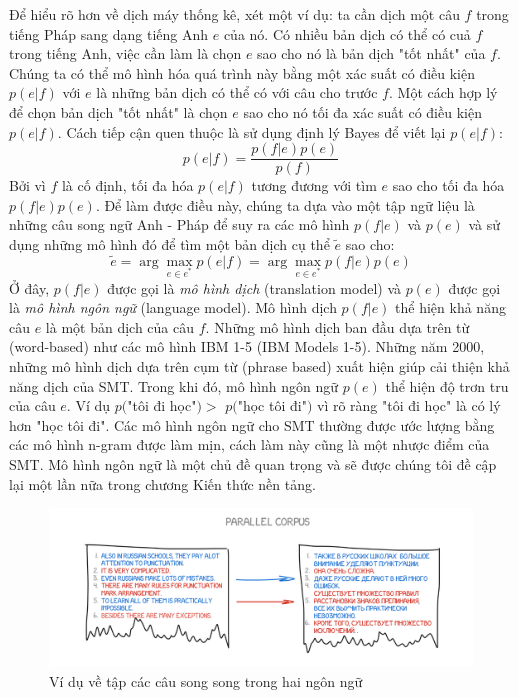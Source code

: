 Để hiểu rõ hơn về dịch máy thống kê, xét một ví dụ: ta cần dịch một câu $f$ trong tiếng Pháp sang dạng tiếng Anh $e$ của nó. Có nhiều bản dịch có thể có cuả $f$ trong tiếng Anh, việc cần làm là chọn $e$ sao cho nó là bản dịch "tốt nhất" của $f$. Chúng ta có thể mô hình hóa quá trình này bằng một xác suất có điều kiện $p(e|f)$ với $e$ là những bản dịch có thể có với câu cho trước $f$. Một cách hợp lý để chọn bản dịch "tốt nhất" là chọn $e$ sao cho nó tối đa xác suất có điều kiện $p(e|f)$. Cách tiếp cận quen thuộc là sử dụng định lý Bayes để viết lại $p(e|f)$:
\begin{equation} \label{bayesFomular}
	p(e|f) = \frac{p(f|e)p(e)}{p(f)}
\end{equation}
Bởi vì $f$ là cố định, tối đa hóa $p(e|f)$ tương đương với tìm $e$ sao cho tối đa hóa $p(f|e)p(e)$. Để làm được điều này, chúng ta dựa vào một tập ngữ liệu là những câu song ngữ Anh - Pháp để suy ra các mô hình $p(f|e)$ và $p(e)$ và sử dụng những mô hình đó để tìm một bản dịch cụ thể $\tilde{e}$ sao cho:
\begin{equation} \label{ehatSMT}
	\tilde{e} = \arg\max_{e \in e^*} p(e|f) = \arg\max_{e \in e^*} p(f|e)p(e)
\end{equation}
Ở đây, $p(f|e)$ được gọi là \textit{mô hình dịch} (translation model) và $p(e)$ được gọi là \textit{mô hình ngôn ngữ} (language model). Mô hình dịch $p(f|e)$ thể hiện khả năng câu $e$ là một bản dịch của câu $f$. Những mô hình dịch ban đầu dựa trên từ (word-based) như các mô hình IBM 1-5 (IBM Models 1-5). Những năm 2000, những mô hình dịch dựa trên cụm từ (phrase based) xuất hiện giúp cải thiện khả năng dịch của SMT. Trong khi đó, mô hình ngôn ngữ $p(e)$ thể hiện độ trơn tru của câu $e$. Ví dụ $p($"tôi đi học"$) >$ $p($"học tôi đi"$)$ vì rõ ràng "tôi đi học" là có lý hơn "học tôi đi". Các mô hình ngôn ngữ cho SMT thường được ước lượng bằng các mô hình n-gram được làm mịn, cách làm này cũng là một nhược điểm của SMT. Mô hình ngôn ngữ là một chủ đề quan trọng và sẽ được chúng tôi đề cập lại một lần nữa trong chương Kiến thức nền tảng.

\begin{figure}
	\centering
	\includegraphics[width=\textwidth]{smt}
	\caption[Ví dụ về tập các câu song song trong hai ngôn ngữ]{Ví dụ về tập các câu song song trong hai ngôn ngữ}
	\label{fig_parallelcorpus}
\end{figure}


